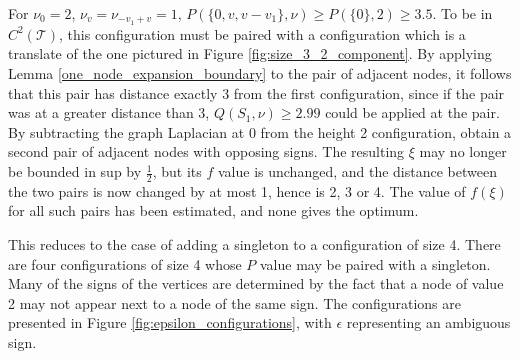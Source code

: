 \documentclass[a4paper, 12pt, notitlepage]{amsart}
\newcommand{\sT}{\mathscr{T}}
\theoremstyle{remark}
\begin{document}
For $\nu_0 = 2$, $\nu_{v} = \nu_{-v_1+v}=1$, $P(\{0, v, v-v_1\} , \nu) \geq P(\{0\}, 2) \geq 3.5$.   
To be in $C^2(\sT)$, this configuration must be paired with a configuration which is a translate of the one pictured in Figure \ref{fig:size_3_2_component}.  By applying Lemma \ref{one_node_expansion_boundary} to the pair of adjacent nodes, it follows that this pair has distance exactly 3 from the first configuration, since if the pair was at a greater distance than 3,  $Q(S_1, \nu) \geq 2.99$ could be applied at the pair.  By subtracting the graph Laplacian at 0 from the height 2 configuration, obtain a second pair of adjacent nodes with opposing signs.  The resulting $\xi$ may no longer be bounded in sup by $\frac{1}{2}$, but its $f$ value is unchanged, and the distance between the two pairs is now changed by at most 1, hence is 2, 3 or 4.  The value of $f(\xi)$ for all such pairs has been estimated, and none gives the optimum.



This reduces to the case of adding a singleton to a configuration of size 4.  There are four configurations of size 4 whose $P$ value may be paired with a singleton.  Many of the signs of the vertices are determined by the fact that a node of value 2 may not appear next to a node of the same sign.  The configurations are presented in Figure \ref{fig:epsilon_configurations}, with $\epsilon$ representing an ambiguous sign.
\end{document}
